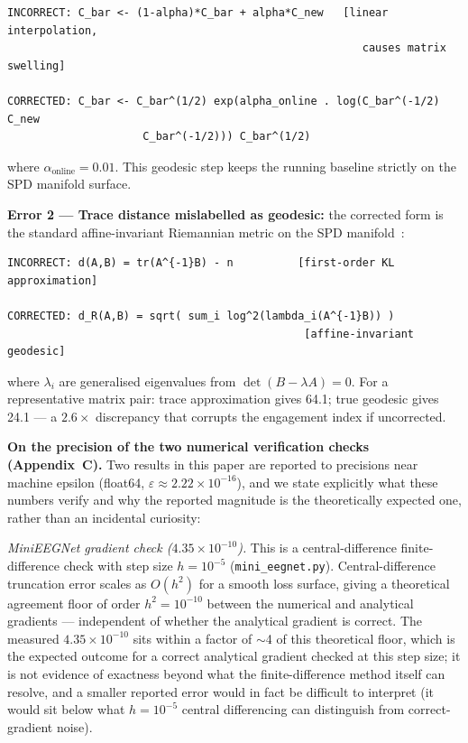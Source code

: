 \documentclass[11pt]{article}
\newcommand{\code}[1]{\texttt{#1}}
\begin{document}
\begin{verbatim}
INCORRECT: C_bar <- (1-alpha)*C_bar + alpha*C_new   [linear interpolation,
                                                       causes matrix swelling]

CORRECTED: C_bar <- C_bar^(1/2) exp(alpha_online . log(C_bar^(-1/2) C_new
                     C_bar^(-1/2))) C_bar^(1/2)
\end{verbatim}

where $\alpha_\text{online} = 0.01$. This geodesic step keeps the running baseline strictly on the SPD manifold surface.

\textbf{Error 2 --- Trace distance mislabelled as geodesic:} the corrected form is the standard affine-invariant Riemannian metric on the SPD manifold~\cite{pennec2006,barachant2012}:

\begin{verbatim}
INCORRECT: d(A,B) = tr(A^{-1}B) - n          [first-order KL approximation]

CORRECTED: d_R(A,B) = sqrt( sum_i log^2(lambda_i(A^{-1}B)) )
                                              [affine-invariant geodesic]
\end{verbatim}

where $\lambda_i$ are generalised eigenvalues from $\det(B - \lambda A) = 0$. For a representative matrix pair: trace approximation gives 64.1; true geodesic gives 24.1 --- a $2.6\times$ discrepancy that corrupts the engagement index if uncorrected.

\textbf{On the precision of the two numerical verification checks (Appendix~C).} Two results in this paper are reported to precisions near machine epsilon (float64, $\varepsilon \approx 2.22 \times 10^{-16}$), and we state explicitly what these numbers verify and why the reported magnitude is the theoretically expected one, rather than an incidental curiosity:

\emph{MiniEEGNet gradient check ($4.35 \times 10^{-10}$).} This is a central-difference finite-difference check with step size $h = 10^{-5}$ (\code{mini\_eegnet.py}). Central-difference truncation error scales as $O(h^2)$ for a smooth loss surface, giving a theoretical agreement floor of order $h^2 = 10^{-10}$ between the numerical and analytical gradients --- independent of whether the analytical gradient is correct. The measured $4.35 \times 10^{-10}$ sits within a factor of $\sim$4 of this theoretical floor, which is the expected outcome for a correct analytical gradient checked at this step size; it is not evidence of exactness beyond what the finite-difference method itself can resolve, and a smaller reported error would in fact be difficult to interpret (it would sit below what $h = 10^{-5}$ central differencing can distinguish from correct-gradient noise).
\end{document}
